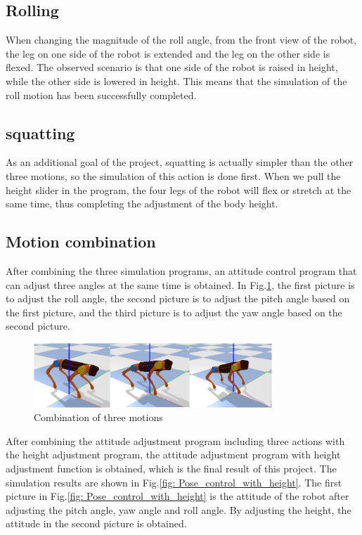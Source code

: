 \subsection{Rolling}
When changing the magnitude of the roll angle, from the front view of the robot, the leg on one side of the robot is extended and the leg on the other side is flexed. The observed scenario is that one side of the robot is raised in height, while the other side is lowered in height. This means that the simulation of the roll motion has been successfully completed.

\subsection{squatting}
As an additional goal of the project, squatting is actually simpler than the other three motions, so the simulation of this action is done first. When we pull the height slider in the program, the four legs of the robot will flex or stretch at the same time, thus completing the adjustment of the body height.

\subsection{Motion combination}

After combining the three simulation programs, an attitude control program that can adjust three angles at the same time is obtained. In Fig.\ref{fig: Combination_of_three_motions}, the first picture is to adjust the roll angle, the second picture is to adjust the pitch angle based on the first picture, and the third picture is to adjust the yaw angle based on the second picture.

\begin{figure}[htbp]
   \centering
   \includegraphics[width=0.8\textwidth]{figures/Combination_of_three_motions.png}
   \caption{Combination of three motions}
   \label{fig: Combination_of_three_motions}
\end{figure}

After combining the attitude adjustment program including three actions with the height adjustment program, the attitude adjustment program with height adjustment function is obtained, which is the final result of this project. The simulation results are shown in Fig.\ref{fig: Pose_control_with_height}. The first picture in Fig.\ref{fig: Pose_control_with_height} is the attitude of the robot after adjusting the pitch angle, yaw angle and roll angle. By adjusting the height, the attitude in the second picture is obtained.

